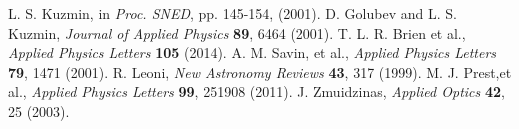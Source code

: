 \documentclass[final]{svjour2}
\begin{document}
\begin{thebibliography}{99}
L. S. Kuzmin, in \textit{Proc. SNED}, pp. 145-154, (2001).
D. Golubev and L. S. Kuzmin, \textit{Journal of Applied Physics} \textbf{89},
6464 (2001).
T. L. R. Brien et al., \textit{Applied Physics Letters} \textbf{105} (2014).
A. M. Savin, et al., \textit{Applied Physics Letters} \textbf{79}, 1471 (2001).
R. Leoni, \textit{New Astronomy Reviews} \textbf{43}, 317 (1999).
M. J. Prest,et al., \textit{Applied Physics Letters} \textbf{99}, 251908 (2011).
J. Zmuidzinas, \textit{Applied Optics} \textbf{42}, 25 (2003).
\end{thebibliography}
\end{document}
